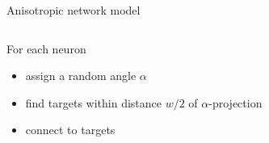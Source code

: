 \begin{frame}{Anisotropic network model}
\begin{columns}
\begin{column}{.5\textwidth}
      \vfill
      For each neuron\\[-0.2cm]

      \begin{itemize}[leftmargin=0.5cm]

        \itemsep8pt
        
       \item<4->[-] assign a random angle $\alpha$ 

       \item<5->[-] find targets within distance $w/2$ of
         $\alpha$-projection

       \item<6->[-] connect to targets
         
      \end{itemize}
     
      \vspace{1.05cm}
      
      \endminipage      
    \end{column}
  \end{columns}


\end{frame}
